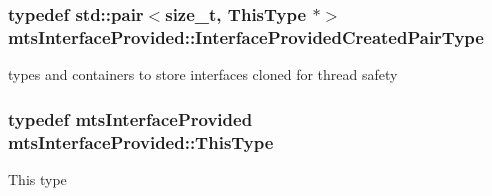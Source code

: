 \hypertarget{classmts_interface_provided_aa164de28d3de94ec992b6b93d5a8de5e}{
\subsubsection[{Interface\-Provided\-Created\-Pair\-Type}]{\setlength{\rightskip}{0pt plus 5cm}typedef std\-::pair$<$size\-\_\-t, {\bf This\-Type} $\ast$$>$ {\bf mts\-Interface\-Provided\-::\-Interface\-Provided\-Created\-Pair\-Type}\hspace{0.3cm}{\ttfamily [protected]}}}\label{classmts_interface_provided_aa164de28d3de94ec992b6b93d5a8de5e}
types and containers to store interfaces cloned for thread safety \hypertarget{classmts_interface_provided_a487e1de997186e03ed38d365592fd180}{
\subsubsection[{This\-Type}]{\setlength{\rightskip}{0pt plus 5cm}typedef {\bf mts\-Interface\-Provided} {\bf mts\-Interface\-Provided\-::\-This\-Type}}}\label{classmts_interface_provided_a487e1de997186e03ed38d365592fd180}
This type 

